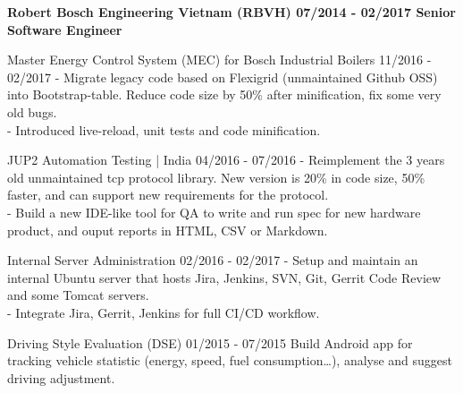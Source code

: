 {  \textbf{\event
    {Robert Bosch Engineering Vietnam (RBVH)}
    {07/2014 - 02/2017}
    {Senior Software Engineer}
  }

  \event
  {Master Energy Control System (MEC) for Bosch Industrial Boilers}
  {11/2016 - 02/2017}
  {
     - Migrate legacy code based on Flexigrid (unmaintained Github OSS) into
     Bootstrap-table. Reduce code size by 50\% after minification, fix some
     very old bugs.\\
     - Introduced live-reload, unit tests and code minification.
  }

  \event
  {JUP2 Automation Testing | India}
  {04/2016 - 07/2016}
  {
    - Reimplement the 3 years old unmaintained tcp protocol library. New
    version is 20\% in code size, 50\% faster, and can support new requirements
    for the protocol. \\
    - Build a new IDE-like tool for QA to write and run spec for new hardware
    product, and ouput reports in HTML, CSV or Markdown.
  }

  \event
  {Internal Server Administration}
  {02/2016 - 02/2017}
  {
    - Setup and maintain an internal Ubuntu server that hosts Jira, Jenkins,
      SVN, Git, Gerrit Code Review and some Tomcat servers.\\
    - Integrate Jira, Gerrit, Jenkins for full CI/CD workflow.
  }

  \event
  {Driving Style Evaluation (DSE)}
  {01/2015 - 07/2015}
  {
    Build Android app for tracking vehicle statistic (energy, speed, fuel
    consumption\dots), analyse and suggest driving adjustment.
  }
}
